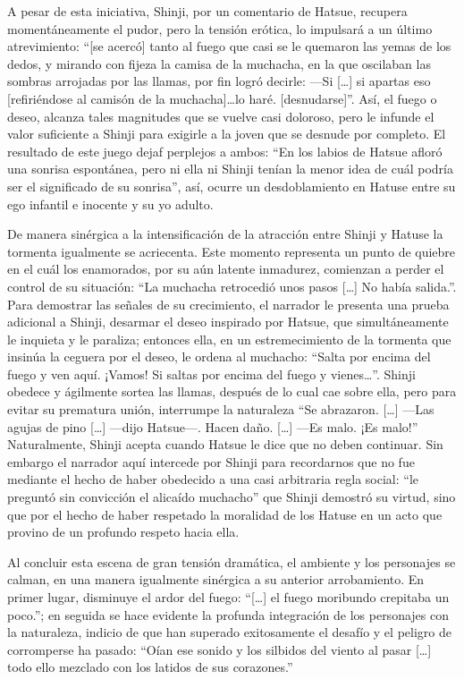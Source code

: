 A pesar de esta iniciativa, Shinji, por un comentario de Hatsue, recupera momentáneamente el pudor, pero la tensión erótica, lo impulsará a un último atrevimiento: ``[se acercó] tanto al fuego que casi se le quemaron las yemas de los dedos, y mirando con fijeza la camisa de la muchacha, en la que oscilaban las sombras arrojadas por las llamas, por fin logró decirle:
—Si [\ldots] si apartas eso [refiriéndose al camisón de la muchacha]\ldots lo haré. [desnudarse]''\autocite{mishima2006}. Así, el fuego o deseo, alcanza tales magnitudes que se vuelve casi doloroso, pero le infunde el valor suficiente a Shinji para exigirle a la joven que se desnude por completo.
El resultado de este juego dejaf perplejos a ambos: ``En los labios de Hatsue afloró una sonrisa espontánea, pero ni ella ni Shinji tenían la menor idea de cuál podría ser el significado de su sonrisa''\autocite{mishima2006}, así, ocurre un desdoblamiento en Hatuse entre su ego infantil e inocente y su yo adulto. 

De manera sinérgica a la intensificación de la atracción entre Shinji y Hatuse la tormenta igualmente se acriecenta. Este momento representa un punto de quiebre en el cuál los enamorados, por su aún latente inmadurez, comienzan a perder el control de su situación: ``La muchacha retrocedió unos pasos [\ldots] No había salida.''\autocite{mishima2006}. Para demostrar las señales de su crecimiento, el narrador le presenta una prueba adicional a Shinji, desarmar el deseo inspirado por Hatsue, que simultáneamente le inquieta y le paraliza; entonces ella, en un estremecimiento de la tormenta que insinúa la ceguera por el deseo, le ordena al muchacho: ``Salta por encima del fuego y ven aquí. ¡Vamos! Si saltas por encima del fuego y vienes\ldots''\autocite{mishima2006}. Shinji obedece y ágilmente sortea las llamas, después de lo cual cae sobre ella, pero para evitar su prematura unión, interrumpe la naturaleza ``Se abrazaron. [\ldots] —Las agujas de pino [\ldots] —dijo Hatsue—. Hacen daño. [\ldots] —Es malo. ¡Es malo!''\autocite{mishima2006} Naturalmente, Shinji acepta cuando Hatsue le dice que no deben continuar. Sin embargo el narrador aquí intercede por Shinji para recordarnos que no fue mediante el hecho de haber obedecido a una casi arbitraria regla social: ``le preguntó sin convicción el alicaído muchacho''\autocite{mishima2006} que Shinji demostró su virtud, sino que por el hecho de haber respetado la moralidad de los Hatuse en un acto que provino de un profundo respeto hacia ella. 

Al concluir esta escena de gran tensión dramática, el ambiente y los personajes se calman, en una manera igualmente sinérgica a su anterior arrobamiento. En primer lugar, disminuye el ardor del fuego: ``[\ldots] el fuego moribundo crepitaba un poco.''\autocite{mishima2006}; en seguida se hace evidente la profunda integración de los personajes con la naturaleza, indicio de que han superado exitosamente el desafío y el peligro de corromperse ha pasado: ``Oían ese sonido y los silbidos del viento al pasar [\ldots] todo ello mezclado con los latidos de sus corazones.''\autocite{mishima2006}

